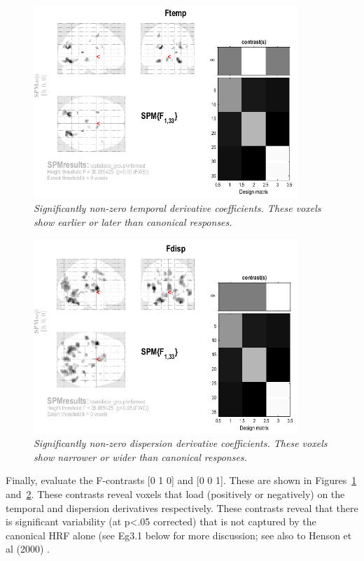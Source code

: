 \begin{figure}
\begin{center}
\includegraphics[width=100mm]{Ftemp}
\caption{\em Significantly non-zero temporal derivative coefficients. These voxels show earlier or later than canonical responses. \label{informed_Ftemp}}
\end{center}
\end{figure}
\begin{figure}
\begin{center}
\includegraphics[width=100mm]{Fdisp}
\caption{\em Significantly non-zero dispersion derivative coefficients. These voxels show narrower or wider than canonical responses. \label{informed_Fdisp}}
\end{center}
\end{figure}

	Finally, evaluate the F-contrasts [0 1 0] and [0 0 1]. These 
	are shown in Figures~\ref{informed_Ftemp} and~\ref{informed_Fdisp}.
These contrasts reveal voxels that load (positively or negatively) on the temporal and dispersion derivatives respectively. These contrasts reveal that there is significant variability (at p<.05 corrected) that is not captured by the canonical HRF alone (see Eg3.1 below for more discussion; see also to Henson et al (2000) \cite{rnah_basis}.


